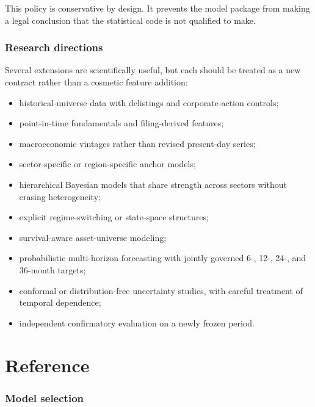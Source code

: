 \documentclass[11pt]{article}
\begin{document}
This policy is conservative by design. It prevents the model package from making a legal conclusion that the statistical code is not qualified to make.

\section{Research directions}

Several extensions are scientifically useful, but each should be treated as a new contract rather than a cosmetic feature addition:

\begin{itemize}
\item historical-universe data with delistings and corporate-action controls;
\item point-in-time fundamentals and filing-derived features;
\item macroeconomic vintages rather than revised present-day series;
\item sector-specific or region-specific anchor models;
\item hierarchical Bayesian models that share strength across sectors without erasing heterogeneity;
\item explicit regime-switching or state-space structures;
\item survival-aware asset-universe modeling;
\item probabilistic multi-horizon forecasting with jointly governed 6-, 12-, 24-, and 36-month targets;
\item conformal or distribution-free uncertainty studies, with careful treatment of temporal dependence;
\item independent confirmatory evaluation on a newly frozen period.
\end{itemize}

\part{Reference}

\section{Model selection}
\end{document}
